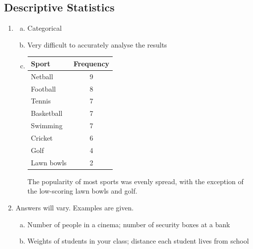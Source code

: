 \documentclass{article}
\begin{document}
\subsection{Descriptive Statistics}
\begin{enumerate}
    \item \begin{enumerate}[(a)]
  \item Categorical
  \item Very difficult to accurately analyse the results
  \item  \phantom{x}
  \vspace{0.4em}
  \begin{center}
  \renewcommand{\arraystretch}{1.4}
  \begin{tabular}{lc}
    \toprule
    \textbf{Sport} & \textbf{Frequency} \\
    \midrule
    Netball    & 9 \\
    Football   & 8 \\
    Tennis     & 7 \\
    Basketball & 7 \\
    Swimming   & 7 \\
    Cricket    & 6 \\
    Golf       & 4 \\
    Lawn bowls & 2 \\
    \bottomrule
  \end{tabular}
  \end{center}
 
  \vspace{0.3em}
  The popularity of most sports was evenly spread, with the exception of the low-scoring lawn bowls and golf.
\end{enumerate}
  
\item Answers will vary. Examples are given.
\begin{enumerate}[(a)] 
  \item Number of people in a cinema; number of security boxes at a bank
  \item Weights of students in your class; distance each student lives from school
\end{enumerate}
 

\end{enumerate}
\end{document}
